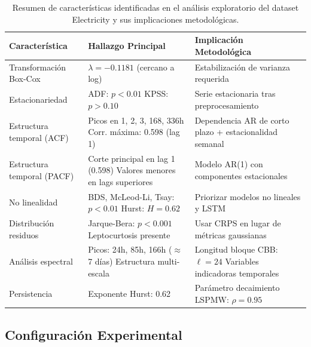 \begin{table}[htbp]
\centering
\caption{Resumen de características identificadas en el análisis exploratorio del dataset Electricity y sus implicaciones metodológicas.}
\label{tab:elec_eda_summary}
\small
\begin{tabular}{p{4cm}p{5cm}p{5cm}}
\toprule
\textbf{Característica} & \textbf{Hallazgo Principal} & \textbf{Implicación Metodológica} \\
\midrule
Transformación Box-Cox & $\lambda = -0.1181$ (cercano a log) & Estabilización de varianza requerida \\
\addlinespace
Estacionariedad & ADF: $p < 0.01$ \newline KPSS: $p > 0.10$ & Serie estacionaria tras preprocesamiento \\
\addlinespace
Estructura temporal (ACF) & Picos en 1, 2, 3, 168, 336h \newline Corr. máxima: 0.598 (lag 1) & Dependencia AR de corto plazo + estacionalidad semanal \\
\addlinespace
Estructura temporal (PACF) & Corte principal en lag 1 (0.598) \newline Valores menores en lags superiores & Modelo AR(1) con componentes estacionales \\
\addlinespace
No linealidad & BDS, McLeod-Li, Tsay: $p < 0.01$ \newline Hurst: $H = 0.62$ & Priorizar modelos no lineales y LSTM \\
\addlinespace
Distribución residuos & Jarque-Bera: $p < 0.001$ \newline Leptocurtosis presente & Usar CRPS en lugar de métricas gaussianas \\
\addlinespace
Análisis espectral & Picos: 24h, 85h, 166h ($\approx$ 7 días) \newline Estructura multi-escala & Longitud bloque CBB: $\ell = 24$ \newline Variables indicadoras temporales \\
\addlinespace
Persistencia & Exponente Hurst: 0.62 & Parámetro decaimiento LSPMW: $\rho = 0.95$ \\
\bottomrule
\end{tabular}
\end{table}

\subsection{Configuración Experimental}
\label{subsec:elec_configuracion}

